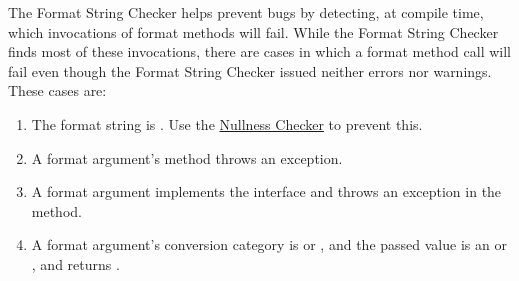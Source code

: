 %
%


The Format String Checker helps prevent bugs by detecting, at compile time,
which invocations of format methods will fail. While the Format String Checker
finds most of these invocations, there are cases in which a format method call
will fail even though the Format String Checker issued neither errors nor
warnings. These cases are:

\begin{enumerate}
\item The format string is . Use the \hyperref[nullness-checker]{Nullness Checker} to prevent this.
\item A format argument's  method throws an exception.
\item A format argument implements the  interface and throws an
    exception in the  method.
\item A format argument's conversion category is  or ,
    and the passed value is an  or , and
     returns .
\end{enumerate}

